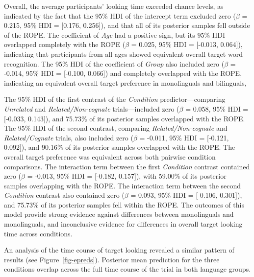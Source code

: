 \documentclass[
  12pt,
  b5paperpaper,
  twoside]{scrreprt}
\begin{document}
Overall, the average participants' looking time exceeded chance levels,
as indicated by the fact that the 95\% HDI of the intercept term
excluded zero (\(\beta\) = 0.215, 95\% HDI = {[}0.176, 0.256{]}), and
that all of its posterior samples fell outside of the ROPE. The
coefficient of \emph{Age} had a positive sign, but its 95\% HDI
overlapped completely with the ROPE (\(\beta\) = 0.025, 95\% HDI =
{[}-0.013, 0.064{]}), indicating that participants from all ages showed
equivalent overall target word recognition. The 95\% HDI of the
coefficient of \emph{Group} also included zero (\(\beta\) = -0.014, 95\%
HDI = {[}-0.100, 0.066{]}) and completely overlapped with the ROPE,
indicating an equivalent overall target preference in monolinguals and
bilinguals,

The 95\% HDI of the first contrast of the \emph{Condition}
predictor---comparing \emph{Unrelated} and \emph{Related/Non-cognate}
trials---included zero (\(\beta\) = 0.058, 95\% HDI = {[}-0.033,
0.143{]}), and 75.73\% of its posterior samples overlapped with the
ROPE. The 95\% HDI of the second contrast, comparing
\emph{Related/Non-cognate} and \emph{Related/Cognate} trials, also
included zero (\(\beta\) = -0.011, 95\% HDI = {[}-0.121, 0.092{]}), and
90.16\% of its posterior samples overlapped with the ROPE. The overall
target preference was equivalent across both pairwise condition
comparisons. The interaction term between the first \emph{Condition}
contrast contained zero (\(\beta\) = -0.013, 95\% HDI = {[}-0.182,
0.157{]}), with 59.00\% of its posterior samples overlapping with the
ROPE. The interaction term between the second \emph{Condition} contrast
also contained zero (\(\beta\) = 0.093, 95\% HDI = {[}-0.106, 0.301{]}),
and 75.73\% of its posterior samples fell within the ROPE. The outcomes
of this model provide strong evidence against differences between
monolinguals and monolinguals, and inconclusive evidence for differences
in overall target looking time across conditions.

An analysis of the time course of target looking revealed a similar
pattern of results (see Figure~\ref{fig-epreds}). Posterior mean
prediction for the three conditions overlap across the full time course
of the trial in both language groups.
\end{document}
